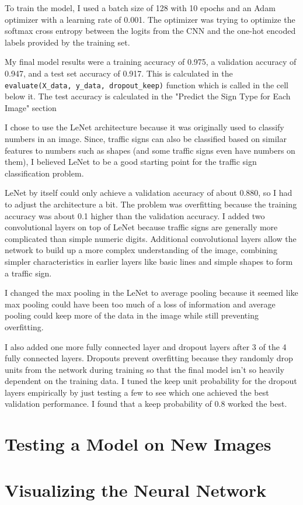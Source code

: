 \documentclass[12pt]{article}
\begin{document}
To train the model, I used a batch size of 128 with 10 epochs and an Adam optimizer with a learning rate of 0.001. The optimizer was trying to optimize the softmax cross entropy between the logits from the CNN and the one-hot encoded labels provided by the training set.

My final model results were a training accuracy of 0.975, a validation accuracy of 0.947, and a test set accuracy of 0.917. This is calculated in the \verb|evaluate(X_data, y_data, dropout_keep)| function which is called in the cell below it. The test accuracy is calculated in the "Predict the Sign Type for Each Image" section

I chose to use the LeNet architecture because it was originally used to classify numbers in an image. Since, traffic signs can also be classified based on similar features to numbers such as shapes (and some traffic signs even have numbers on them), I believed LeNet to be a good starting point for the traffic sign classification problem.

LeNet by itself could only achieve a validation accuracy of about 0.880, so I had to adjust the architecture a bit. The problem was overfitting because the training accuracy was about 0.1 higher than the validation accuracy. I added two convolutional layers on top of LeNet because traffic signs are generally more complicated than simple numeric digits. Additional convolutional layers allow the network to build up a more complex understanding of the image, combining simpler characteristics in earlier layers like basic lines and simple shapes to form a traffic sign. 

I changed the max pooling in the LeNet to average pooling because it seemed like max pooling could have been too much of a loss of information and average pooling could keep more of the data in the image while still preventing overfitting.

I also added one more fully connected layer and dropout layers after 3 of the 4 fully connected layers. Dropouts prevent overfitting because they randomly drop units from the network during training so that the final model isn't so heavily dependent on the training data. I tuned the keep unit probability for the dropout layers empirically by just testing a few to see which one achieved the best validation performance. I found that a keep probability of 0.8 worked the best.

\section{Testing a Model on New Images}

\section{Visualizing the Neural Network}



\end{document}
